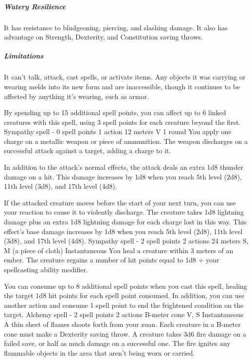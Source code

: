     \subparagraph{Watery Resilience}
    It has resistance to bludgeoning, piercing, and slashing damage.
    It also has advantage on Strength, Dexterity, and Constitution saving throws.

    \subparagraph{Limitations}
    It can't talk, attack, cast spells, or activate items.
    Any objects it was carrying or wearing melds into its new form and are inaccessible, though it continues to be affected by anything it's wearing, such as armor.

    By spending up to 15 additional spell points, you can affect up to 6 linked creatures with this spell, using 3 spell points for each creature beyond the first.
    {Sympathy spell - 0 spell points}
    {1 action}
    {12 meters}
    {V}
    {1 round}
    You apply one charge on a metallic weapon or piece of ammunition.
    The weapon discharges on a successful attack against a target, adding a charge to it.

    In addition to the attack's normal effects, the attack deals an extra 1d8 thunder damage on a hit.
    This damage increases by 1d8 when you reach 5th level (2d8), 11th level (3d8), and 17th level (4d8).

    If the attacked creature moves before the start of your next turn, you can use your reaction to cause it to violently discharge.
    The creature takes 1d8 lightning damage plus an extra 1d8 lightning damage for each charge lost in this way.
    This effect's base damage increases by 1d8 when you reach 5th level (2d8), 11th level (3d8), and 17th level (4d8).
    {Sympathy spell - 2 spell points}
    {2 actions}
    {24 meters}
    {S, M (a piece of cloth)}
    {Instantaneous}
    You heal a creature within 3 meters of an ember.
    The creature regains a number of hit points equal to 1d8 + your spellcasting ability modifier.

    You can consume up to 8 additional spell points when you cast this spell, healing the target 1d8 hit points for each spell point consumed.
    In addition, you can use another action and consume 1 spell point to end the frightened condition on the target.
    {Alchemy spell - 2 spell points}
    {2 actions}
    {B-meter cone}
    {V, S}
    {Instantaneous}
    A thin sheet of flames shoots forth from your zuan.
    Each creature in a B-meter cone must make a Dexterity saving throw.
    A creature takes 3d6 fire damage on a failed save, or half as much damage on a successful one.
    The fire ignites any flammable objects in the area that aren't being worn or carried.

